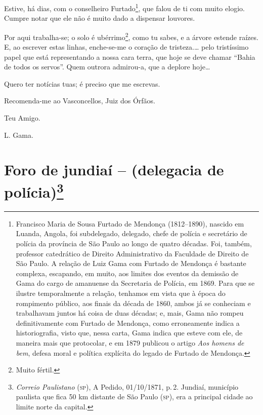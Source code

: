 Estive, há dias, com o conselheiro Furtado\footnote{ Francisco Maria de
  Sousa Furtado de Mendonça (1812--1890), nascido em Luanda, Angola, foi
  subdelegado, delegado, chefe de polícia e secretário de polícia da
  província de São Paulo ao longo de quatro décadas. Foi, também,
  professor catedrático de Direito Administrativo da Faculdade de
  Direito de São Paulo. A relação de Luiz Gama com Furtado de Mendonça é
  bastante complexa, escapando, em muito, aos limites dos eventos da
  demissão de Gama do cargo de amanuense da Secretaria de Polícia, em
  1869. Para que se ilustre temporalmente a relação, tenhamos em vista
  que à época do rompimento público, aos finais da década de 1860, ambos
  já se conheciam e trabalhavam juntos há coisa de duas décadas; e,
  mais, Gama não rompeu definitivamente com Furtado de Mendonça, como
  erroneamente indica a historiografia, visto que, nessa carta, Gama
  indica que esteve com ele, de maneira mais que protocolar, e em 1879
  publicou o artigo \emph{Aos homens de bem}, defesa moral e política
  explícita do legado de Furtado de Mendonça.}, que falou de ti com
muito elogio. Cumpre notar que ele não é muito dado a dispensar
louvores.

Por aqui {trabalha-se}; o solo é ubérrimo\footnote{ Muito fértil.},
como tu sabes, e a árvore estende raízes. E, ao escrever estas linhas,
enche-se-me o coração de tristeza.\ldots{} pelo tristíssimo papel que
está representando a nossa cara terra, que hoje se deve chamar ``Bahia de
todos os servos''. Quem outrora admirou-a, que a deplore hoje\ldots{}

Quero ter notícias tuas; é preciso que me escrevas.

Recomenda-me ao Vasconcellos, Juiz dos Órfãos.

Teu Amigo.

L. Gama.

\chapter{Foro de jundiaí -- (delegacia de polícia)\footnote{\emph{Correio Paulistano} (\textsc{sp}), A Pedido, 01/10/1871,
  p.\,2. Jundiaí, município paulista que fica 50 km distante de São Paulo
  (\textsc{sp}), era a principal cidade ao limite norte da capital.}} %

